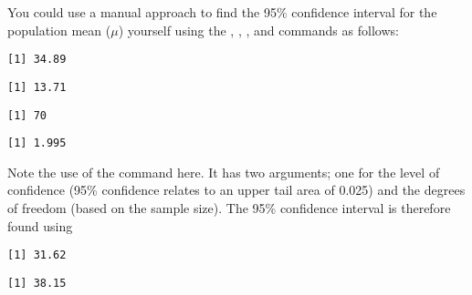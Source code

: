 You could use a manual approach to find the 95\% confidence interval for the population mean ($\mu$) yourself using the , , , and  commands as follows:  
\begin{knitrout}
\color{fgcolor}\begin{kframe}
\begin{alltt}
\hlstd{> }
\end{alltt}
\begin{verbatim}
[1] 34.89
\end{verbatim}
\begin{alltt}
\hlstd{> }
\end{alltt}
\begin{verbatim}
[1] 13.71
\end{verbatim}
\begin{alltt}
\hlstd{> }
\end{alltt}
\begin{verbatim}
[1] 70
\end{verbatim}
\begin{alltt}
\hlstd{> }\hlstd{(}\hlstd{,} \hlopt{-}\hlstd{)}
\end{alltt}
\begin{verbatim}
[1] 1.995
\end{verbatim}
\end{kframe}
\end{knitrout}
Note the use of the  command here. It has two arguments; one for the level of confidence (95\% confidence relates to an upper tail area of 0.025) and the degrees of freedom (based on the sample size). The 95\% confidence interval is therefore found using 
\begin{knitrout}
\color{fgcolor}\begin{kframe}
\begin{alltt}
\hlstd{> } \hlopt{-} \hlstd{(}\hlstd{,} \hlopt{-}\hlstd{)} \hlopt{*}  \hlopt{/} \hlstd{(}
\end{alltt}
\begin{verbatim}
[1] 31.62
\end{verbatim}
\begin{alltt}
\hlstd{> } \hlopt{+} \hlstd{(}\hlstd{,} \hlopt{-}\hlstd{)} \hlopt{*}  \hlopt{/} \hlstd{(}
\end{alltt}
\begin{verbatim}
[1] 38.15
\end{verbatim}
\end{kframe}
\end{knitrout}
